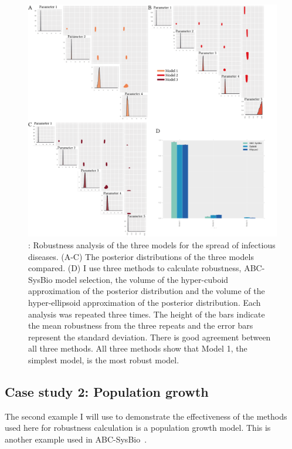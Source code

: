 \begin{figure}[p]
\begin{center}
\includegraphics[width=\textwidth]{../../chapters/chapterStabilityFinder/images/ex1_sum.png}
\caption[LoF caption]{\label{fig:rob_sysbio1}: Robustness analysis of the three models for the spread of infectious diseases. (A-C) The posterior distributions of the three models compared. (D) I use three methods to calculate robustness, ABC-SysBio model selection, the volume of the hyper-cuboid approximation of the posterior distribution and the volume of the hyper-ellipsoid approximation of the posterior distribution. Each analysis was repeated three times. The height of the bars indicate the mean robustness from the three repeats and the error bars represent the standard deviation. There is good agreement between all three methods. All three methods show that Model 1, the simplest model, is the most robust model. }

\end{center}
\end{figure}
\clearpage

\subsection{Case study 2: Population growth}
\label{sec:cs2}
The second example I will use to demonstrate the effectiveness of the methods used here for robustness calculation is a population growth model. This is another example used in ABC-SysBio~\autocite{Toni:2009tr}.

